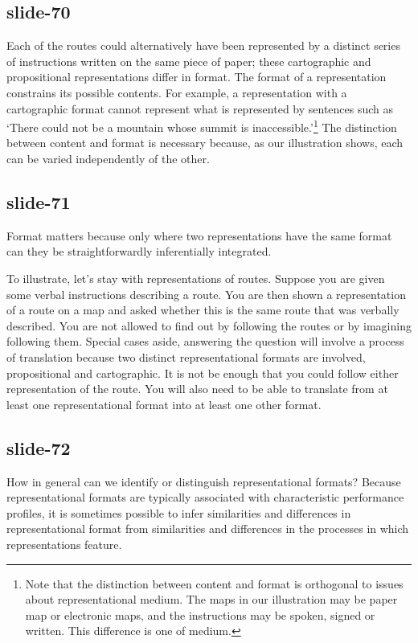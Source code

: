 \documentclass[12pt,\papersize]{extarticle}
\begin{document}
\subsection{slide-70}
Each of the routes could alternatively have been represented by a distinct series
of instructions written on the same piece of paper; these cartographic and
propositional representations differ in format. The format of a representation
constrains its possible contents. For example, a representation with a cartographic
format cannot represent what is represented by sentences such as `There could not be a
mountain whose summit is inaccessible.'\footnote{ Note that the distinction between
content and format is orthogonal to issues about representational medium. The maps in
our illustration may be paper map or electronic maps, and the instructions may be spoken,
signed or written. This difference is one of medium.} The distinction between content and
format is necessary because, as our illustration shows, each can be varied independently
of the other.

\subsection{slide-71}
Format matters because only where two representations have the same format can they be straightforwardly inferentially integrated.

To illustrate, let’s stay with representations of routes.
Suppose you are given some verbal instructions describing a route. You are then shown a representation of a route on a map and asked whether this is the same route that was verbally described. You are not allowed to find out by following the routes or by imagining following them.
Special cases aside, answering the question will involve a process of translation because two distinct representational formats are involved, propositional and cartographic. It is not be enough that you could follow either representation of the route. You will also need to be able to translate from at least one representational format into at least one other format.

\subsection{slide-72}
How in general can we identify or distinguish representational formats? Because representational formats are typically associated with characteristic performance profiles, it is sometimes possible to infer similarities and differences in representational format from similarities and differences in the processes in which representations feature.
\end{document}
